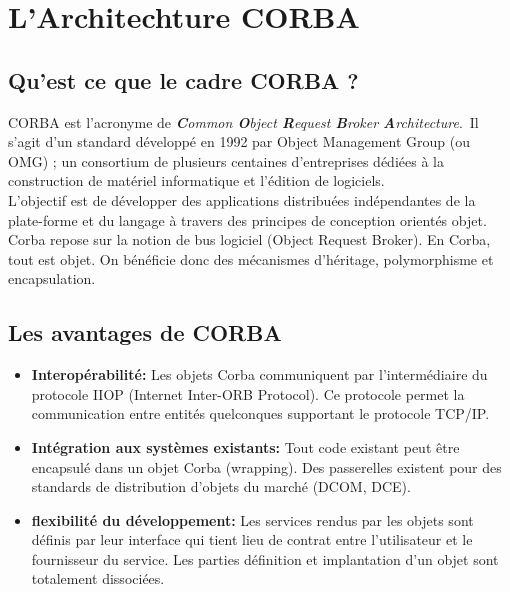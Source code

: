 \section{L'Architechture CORBA}

    \subsection{Qu'est ce que le cadre CORBA ?}

        \par CORBA est l’acronyme de \textit{\textbf{C}ommon \textbf{O}bject \textbf{R}equest \textbf{B}roker \textbf{A}rchitecture}. Il s’agit d’un standard développé en 1992 par Object Management Group (ou OMG) ; un consortium de plusieurs centaines d’entreprises dédiées à la construction de matériel informatique et l’édition de logiciels.\\
        L’objectif est de développer des applications distribuées indépendantes de la plate-forme et du langage à travers des principes de conception orientés objet.\\

        Corba repose sur la notion de bus logiciel (Object Request Broker).
        En Corba, tout est objet. On bénéficie donc des mécanismes d'héritage, polymorphisme et encapsulation.

    \subsection{Les avantages de CORBA}

        \begin{itemize}[label= ]
            \item \textbf{Interopérabilité: }Les objets Corba communiquent par l'intermédiaire du protocole IIOP (Internet Inter-ORB Protocol). Ce protocole permet la communication entre entités quelconques supportant le protocole TCP/IP.
            \item \textbf{Intégration aux systèmes existants: }Tout code existant peut être encapsulé dans un objet Corba (wrapping). Des passerelles existent pour des standards de distribution d'objets du marché (DCOM, DCE).
            \item \textbf{flexibilité du développement: }Les services rendus par les objets sont définis par leur interface qui tient lieu de contrat entre l'utilisateur et le fournisseur du service. Les parties définition et implantation d'un objet sont totalement dissociées.
        \end{itemize}

